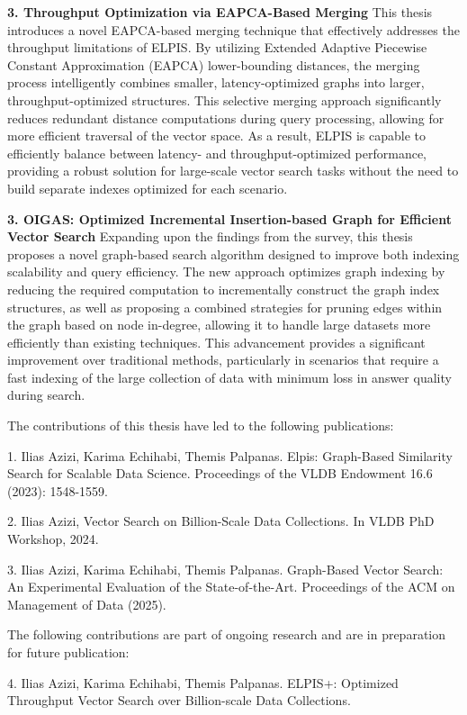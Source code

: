 \textbf{3. Throughput Optimization via EAPCA-Based Merging}  
This thesis introduces a novel EAPCA-based merging technique that effectively addresses the throughput limitations of ELPIS. By utilizing Extended Adaptive Piecewise Constant Approximation (EAPCA) lower-bounding distances, the merging process intelligently combines smaller, latency-optimized graphs into larger, throughput-optimized structures. This selective merging approach significantly reduces redundant distance computations during query processing, allowing for more efficient traversal of the vector space. As a result, ELPIS is capable to efficiently balance between latency- and throughput-optimized performance, providing a robust solution for large-scale vector search tasks without the need to build separate indexes optimized for each scenario.

\textbf{3. OIGAS: Optimized Incremental Insertion-based Graph for Efficient Vector Search}  
Expanding upon the findings from the survey, this thesis proposes a novel graph-based search algorithm designed to improve both indexing scalability and query efficiency. The new approach optimizes graph indexing by reducing the required computation to incrementally construct the graph index structures, as well as proposing a combined strategies for pruning edges within the graph based on node in-degree, allowing it to handle large datasets more efficiently than existing techniques. This advancement provides a significant improvement over traditional methods, particularly in scenarios that require a fast indexing of the large collection of data with minimum loss in answer quality during search.


The contributions of this thesis have led to the following publications:

1. Ilias Azizi, Karima Echihabi, Themis Palpanas. Elpis: Graph-Based Similarity Search for Scalable Data Science. Proceedings of the VLDB Endowment 16.6 (2023): 1548-1559.~\cite{elpis}

2. Ilias Azizi, Vector Search on Billion-Scale Data Collections. In VLDB PhD Workshop, 2024.~\cite{iazizi2024}

3. Ilias Azizi, Karima Echihabi, Themis Palpanas. Graph-Based Vector Search:
An Experimental Evaluation of the State-of-the-Art. Proceedings of the ACM on Management of Data (2025).~\cite{gass}

The following contributions are part of ongoing research and are in preparation for future publication:

4. Ilias Azizi, Karima Echihabi, Themis Palpanas. ELPIS+: Optimized Throughput Vector Search over Billion-scale Data Collections. 

